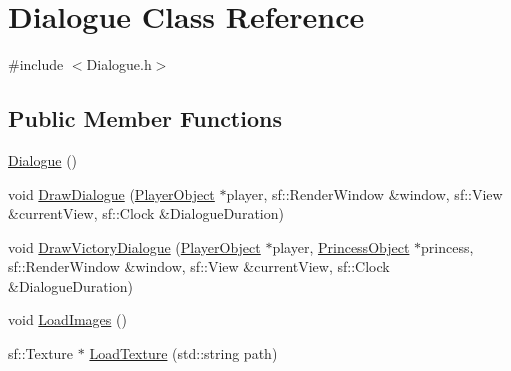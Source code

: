 \hypertarget{classDialogue}{}\section{Dialogue Class Reference}
\label{classDialogue}


{\ttfamily \#include $<$Dialogue.\+h$>$}

\subsection*{Public Member Functions}
\begin{DoxyCompactItemize}
\item 
\hyperlink{classDialogue_a19d148eafc73a01c0d9a919517da0811}{Dialogue} ()
\item 
void \hyperlink{classDialogue_a03e0be8d940c3b4fa184efe080aa3615}{Draw\+Dialogue} (\hyperlink{classPlayerObject}{Player\+Object} $\ast$player, sf\+::\+Render\+Window \&window, sf\+::\+View \&current\+View, sf\+::\+Clock \&Dialogue\+Duration)
\item 
void \hyperlink{classDialogue_af466664e3113b83d063a112090229691}{Draw\+Victory\+Dialogue} (\hyperlink{classPlayerObject}{Player\+Object} $\ast$player, \hyperlink{classPrincessObject}{Princess\+Object} $\ast$princess, sf\+::\+Render\+Window \&window, sf\+::\+View \&current\+View, sf\+::\+Clock \&Dialogue\+Duration)
\item 
void \hyperlink{classDialogue_ae1ec1ec122b7840006671d0b511ada3a}{Load\+Images} ()
\item 
sf\+::\+Texture $\ast$ \hyperlink{classDialogue_a3fb8644f167af142d1413c0fa6b74434}{Load\+Texture} (std\+::string path)
\end{DoxyCompactItemize}
